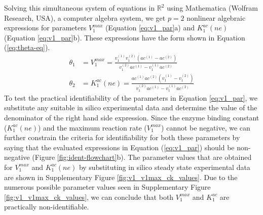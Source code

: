 \documentclass[10pt]{article}
\begin{document}
	Solving this simultaneous system of equations in $\mathbb{R}^2$ using Mathematica (Wolfram Research, USA), a computer algebra system, we get $p=2$ nonlinear algebraic expressions for parameters $V_1^{max}$ (Equation \ref{eq:v1_par}a) and $K_1^{ac}(ne)$ (Equation \ref{eq:v1_par}b). These expressions have the form shown in Equation (\ref{eq:theta-eq}).
	\begin{subequations}\label{eq:v1_par}
		\begin{align}		
		\theta_1 &= V_1^{max} = \frac{v_1^{(1)}v_1^{(2)}(ac^{(1)}-ac^{(2)})}{v_1^{(2)}ac^{(1)}-v_1^{(1)}ac^{(2)}}\\
		\theta_2 &= K_1^{ac}(ne) = \frac{ac^{(1)}ac^{(2)}(v_1^{(1)}-v_1^{(2)})}{v_1^{(2)}ac^{(1)}-v_1^{(1)}ac^{(2)}}
		\end{align}
	\end{subequations}
	To test the practical identifiability of the parameters in Equation \ref{eq:v1_par}, we substitute any suitable in silico experimental data and determine the value of the denominator of the right hand side expression. Since the enzyme binding constant ($K_1^{ac}(ne)$) and the maximum reaction rate ($V_1^{max}$) cannot be negative, we can further constrain the criteria for identifiability for both these parameters by saying that the evaluated expressions in Equation (\ref{eq:v1_par}) should be non-negative (Figure \ref{fig:ident-flowchart}b). The parameter values that are obtained for $V_1^{max}$ and $K_1^{ac} (ne)$ by substituting in silico steady state experimental data are shown in Supplementary Figure \ref{fig:v1_v1max_ck_values}. Due to the numerous possible parameter values seen in Supplementary Figure \ref{fig:v1_v1max_ck_values}, we can conclude that both $V_1^{max}$ and $K_1^{ac}$ are practically non-identifiable.
	
\end{document}
